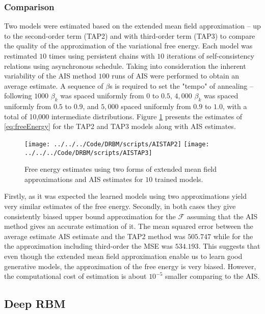 \documentclass[../report/report.tex]{subfiles}
\begin{document}
\subsubsection{Comparison}
Two models were estimated based on the extended mean field approximation -- up to the second-order term (TAP2) and with third-order term (TAP3) to compare the quality of the approximation of the variational free energy.
Each model was restimated $10$ times using persistent chains with $10$ iterations of self-consistency relations using asynchronous schedule. Taking into consideration the inherent variability of the AIS method $100$ runs of AIS were performed to obtain an average estimate.  A sequence of $\beta$s is required to set the "tempo" of annealing -- following \cite{salakhutdinov2008learning} $1000$ $\beta_k$ was spaced uniformly from  $0 $ to  $0.5$, $4,000$ $\beta_k$ was spaced uniformly from $0.5$ to $0.9$, and $5,000$ spaced uniformly from $0.9$ to $1.0$, with a total of 10,000 intermediate distributions. Figure \ref{fig:AISTAP2} presents the estimates of \ref{eq:freeEnergy} for the TAP2 and TAP3 models along with AIS estimates.

\begin{figure}[!htb]
%
 \texttt{[image: ../../../Code/DRBM/scripts/AISTAP2]}
\endminipage 
{}  
 \texttt{[image: ../../../Code/DRBM/scripts/AISTAP3]}
\endminipage\hfill
  \caption[1]{Free energy estimates using two forms of extended mean field approximations and AIS estimates for $10$ trained models.}
  \label{fig:AISTAP2}
\end{figure}

Firstly, as it was expected the learned models using two approximations yield very similar estimates of the free energy. Secondly, in both cases they give consistently biased upper bound approximation for the $\mathcal{F}$ assuming that the AIS method gives an accurate estimation of it. The mean squared error between the average estimate AIS estimate and the TAP2 method was $505.747$ while for the the approximation including third-order the MSE was $534.193$. This suggests that even though the extended mean field approximation enable us to learn good generative models, the approximation of the free energy is very biased. However, the computational cost of estimation is about $10^{-5}$ smaller comparing to the AIS.

\subsection{Deep RBM}
\end{document}
